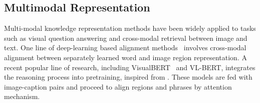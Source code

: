 


\subsection{Multimodal Representation}

Multi-modal knowledge representation methods have been widely applied to tasks such as visual question answering and cross-modal retrieval between image and text. One line of deep-learning based alignment methods~\cite{sim_filter, wei2020multi,ye2019cross, danmm, LiACL2020,radford2021learning} involves cross-modal alignment between separately learned word and image region representation. A recent popular line of research, including VisualBERT~\cite{visualbert} and VL-BERT\cite{vlbert},  integrates the reasoning process into pretraining, inspired from \cite{bert}. These models are fed with image-caption pairs and proceed to align regions and phrases by attention mechanism. 


